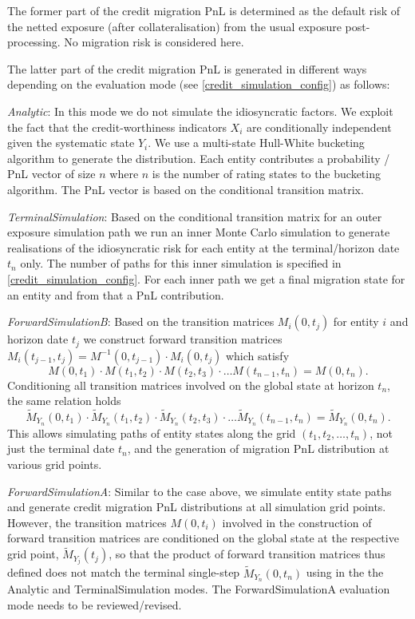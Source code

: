 \documentclass[12pt, a4paper]{article}
\begin{document}
The former part of the credit migration PnL is determined as the default risk of the netted exposure (after
collateralisation) from the usual exposure post-processing. No migration risk is considered here.

The latter part of the credit migration PnL is generated in different ways depending on the evaluation mode (see
\ref{credit_simulation_config}) as follows:

{\em Analytic}: In this mode we do not simulate the idiosyncratic factors.  We exploit the fact that the credit-worthiness indicators $X_i$ are conditionally independent given the
systematic state $Y_i$. We use a multi-state Hull-White bucketing algorithm to generate the distribution. Each entity
contributes a probability / PnL vector of size $n$ where $n$ is the number of rating states to the bucketing
algorithm. The PnL vector is based on the conditional transition matrix.

{\em TerminalSimulation}: Based on the conditional transition matrix for an
outer exposure simulation path we run an inner Monte Carlo simulation to generate realisations of the idiosyncratic risk for each
entity at the terminal/horizon date $t_n$ only. The number of paths for this inner simulation is specified in \ref{credit_simulation_config}. For each inner
path we get a final migration state for an entity and from that a PnL contribution.

{\em ForwardSimulationB}: Based on the transition matrices $M_i(0,t_j)$ for entity $i$ and horizon date $t_j$ we construct 
forward transition matrices $M_i(t_{j-1},t_j) = M^{-1}(0,t_{j-1}) \cdot M_i(0,t_j)$ which satisfy
$$
M(0,t_1) \cdot M(t_1,t_2)\cdot M(t_2, t_3)\cdot \dots M(t_{n-1},t_n) = M(0,t_n).
$$
Conditioning all transition matrices involved on the global state at horizon $t_n$, the same relation holds
$$
\widetilde M_{Y_n}(0,t_1) \cdot \widetilde M_{Y_n}(t_1,t_2)\cdot \widetilde M_{Y_n}(t_2, t_3)\cdot \dots \widetilde M_{Y_n}(t_{n-1},t_n) = \widetilde M_{Y_n}(0,t_n).
$$
This allows simulating paths of entity states along the grid $(t_1, t_2, \dots, t_n)$, not just the terminal date $t_n$, and the generation of migration PnL distribution at various grid points.

{\em ForwardSimulationA}: Similar to the case above, we simulate entity state paths and generate credit migration PnL distributions at all simulation grid points.
However, the transition matrices $M(0,t_i)$ involved in the construction of forward transition matrices are conditioned on the global state at the respective grid point, $\widetilde M_{Y_j}(t_j)$,
so that the product of forward transition matrices thus defined does not match the terminal single-step $\widetilde M_{Y_n}(0,t_n)$ using in the the Analytic and TerminalSimulation modes. 
The ForwardSimulationA evaluation mode needs to be reviewed/revised.
\end{document}
